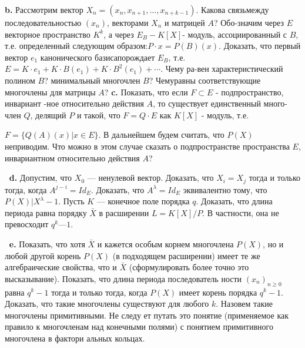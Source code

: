 \documentclass{mai_book}
\begin{document}
\hspace*{15pt}\textbf{b.} Рассмотрим вектор $X_n=(x_n,x_{n+1},\ldots,x_{n+k-1})$. Какова связь\newline между последовательностью $(x_n)$, векторами $X_n$ и матрицей $A$? Обо-\newline значим через $E$ векторное пространство $K^k$, а через $E_B - K[X]$\newline - модуль, ассоциированный с $B$, т.е. определенный следующим образом:\newline $P\cdot x=P(B)(x)$. Доказать, что первый вектор $e_1$ канонического базиса\newline порождает $E_B$, т.е. $E=K\cdot e_1 + K\cdot B(e_1) + K\cdot B^2(e_1) + \cdots$. Чему ра-\newline вен характеристический полином $B$? минимальный многочлен $B$? Чему\newline равны соответствующие многочлены для матрицы $A$? \newline
\hspace*{15pt}\textbf{c.} Показать, что если $F\subset E$ - подпространство, инвариант -\newline ное относительно действия $A$, то существует единственный много-\newline член $Q$, делящий $P$ и такой, что $F=Q\cdot E$ как $K[X]$ - модуль, т.е.\newline

\newpage

\noindent $F = \{Q(A)(x) | x \in E\}$. В дальнейшем будем считать, что $P(X)$ неприводим. Что можно в этом случае сказать о подпространстве пространства $E$, инвариантном относительно действия $A$?

$\:$\newline \indent
\textbf{d.} Допустим, что $X_0$ — ненулевой вектор. Доказать, что $X_i = X_j$ тогда и только тогда, когда $A^{j-i} = Id_E$. Доказать, что $A^\lambda = Id_E$ эквивалентно тому, что $P(X) | X^\lambda - 1$. Пусть $K$ — конечное поле порядка $q$. Доказать, что длина периода равна порядку $\bar{X}$ в расширении $L = K[X]/P$. В частности, она не превосходит $q^k — 1$.

$\:$\newline \indent
\textbf{e.} Показать, что хотя $\bar{X}$ и кажется особым корнем многочлена
$P(X)$, но и любой другой корень $P(X)$ (в подходящем расширении)
имеет те же алгебраические свойства, что и $\bar{X}$ (сформулировать более
точно это высказывание). Показать, что длина периода последователь
ности $(x_n)_{n \geq 0}$ равна $q^k - 1$ тогда и только тогда, когда $P(X)$ имеет
корень порядка $q^k - 1$. Доказать, что такие многочлены существуют
для любого $k$. Назовем такие многочлены примитивными. Не следу
ет путать это понятие (применяемое как правило к многочленам над
конечными полями) с понятием примитивного многочлена в фактори
альных кольцах.
\end{document}
